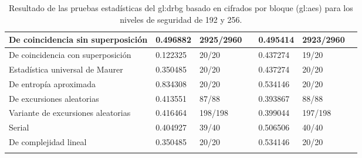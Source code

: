 \begin{longtable}{| m{2.4in} | C{0.65in} | C{0.85in} |
C{0.15in} | C{0.65in} | C{0.85in} | C{0.15in} |}
  De coincidencia sin superposición &
  0.496882 & 2925/2960 &  &
  0.495414 & 2923/2960 &  \\\hline

  De coincidencia con superposición &
  0.122325 &   20/20   &  &
  0.437274 &   19/20   &  \\\hline

  Estadística universal de Maurer &
  0.350485 &   20/20   &  &
  0.437274 &   20/20   &  \\\hline

  De entropía aproximada &
  0.834308 &   20/20   &  &
  0.534146 &   20/20   &  \\\hline

  De excursiones aleatorias &
  0.413551 &   87/88   &  &
  0.393867 &   88/88   &  \\\hline

  Variante de excursiones aleatorias &
  0.416464 &  198/198  &  &
  0.399044 &  197/198  &  \\\hline

  Serial &
  0.404927 &   39/40   &  &
  0.506506 &   40/40   &  \\\hline

  De complejidad lineal &
  0.350485 &   20/20   &  &
  0.534146 &   20/20   &  \\\hline

  \caption{Resultado de las pruebas estadísticas del \gls{gl:drbg} basado
  en cifrados por bloque (\gls{gl:aes}) para los niveles de seguridad de
  192 y 256.}
  \label{resultados_pruebas_drbg_bloque_192_256}

\end{longtable}


